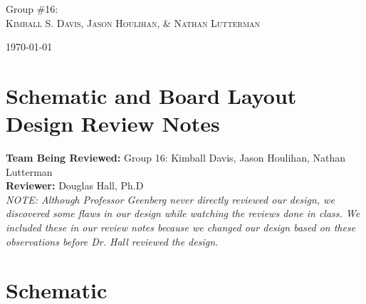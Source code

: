 \documentclass[11pt]{article}
\begin{document}
\begin{titlepage}
	\Large{Group \#16:}\\
		 \Large\textsc{Kimball S. Davis, Jason Houlihan, \& Nathan Lutterman} %
	
	
	\vfill\vfill\vfill\vfill %
	
	{\large\today} %
	
	
	 
	
	\vfill %
	
\end{titlepage}

\setlength{\columnsep}{.2 in}

\setlength{\parskip}{0pt}

	
\section*{Schematic and Board Layout Design Review Notes}
\textbf{Team Being Reviewed:} Group 16: Kimball Davis, Jason Houlihan, Nathan Lutterman\\
\textbf{Reviewer:} Douglas Hall, Ph.D\\

\textit{NOTE: Although Professor Geenberg never directly reviewed our design, we discovered some flaws in our design while watching the reviews done in class. We included these in our review notes because we changed our design based on these observations before Dr. Hall reviewed the design.}

\section*{Schematic} 
\end{document}
